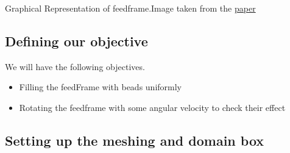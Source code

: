 \documentclass{tufte-book} %
\begin{document}
   \begin{marginfigure}
   \caption{Graphical Representation of feedframe.Image taken from the \href{http://www.americanpharmaceuticalreview.com/Featured-Articles/116357-Sample-Presentation-in-Rotary-Tablet-Press-Feed-Frame-Monitoring-by-Near-Infrared-Spectroscopy/}{paper} }
 \end{marginfigure}

\subsection{Defining our objective}

We will have the following objectives.
\begin{itemize}
\item Filling the feedFrame with beads uniformly
\item Rotating the feedframe with some angular velocity to check their effect
\end{itemize}

\subsection{Setting up the meshing and domain box}
\end{document}

